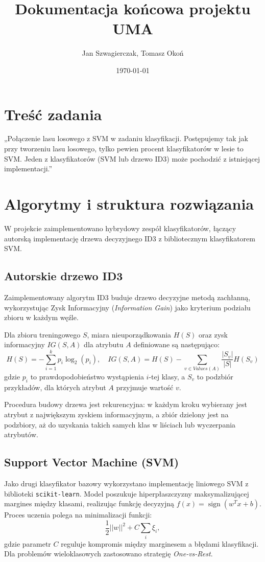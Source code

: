 \documentclass[a4paper,11pt]{article}
\title{\textbf{Dokumentacja końcowa projektu UMA}}
\author{Jan Szwagierczak, Tomasz Okoń}
\date{\today}
\begin{document}
\maketitle

\section{Treść zadania}
„Połączenie lasu losowego z SVM w zadaniu klasyfikacji. Postępujemy tak jak przy tworzeniu lasu losowego, tylko pewien procent klasyfikatorów w lesie to SVM. Jeden z klasyfikatorów (SVM lub drzewo ID3) może pochodzić z istniejącej implementacji.”


\section{Algorytmy i struktura rozwiązania}

W projekcie zaimplementowano hybrydowy zespół klasyfikatorów, łączący autorską implementację drzewa decyzyjnego ID3 z bibliotecznym klasyfikatorem SVM.

\subsection{Autorskie drzewo ID3}
Zaimplementowany algorytm ID3 buduje drzewo decyzyjne metodą zachłanną, wykorzystując Zysk Informacyjny (\textit{Information Gain}) jako kryterium podziału zbioru w każdym węźle.

Dla zbioru treningowego $S$, miara nieuporządkowania $H(S)$ oraz zysk informacyjny $IG(S,A)$ dla atrybutu $A$ definiowane są następująco:
\[
H(S) = - \sum_{i=1}^{k} p_i \log_2(p_i), \quad IG(S, A) = H(S) - \sum_{v \in Values(A)} \frac{|S_v|}{|S|} H(S_v)
\]
gdzie $p_i$ to prawdopodobieństwo wystąpienia $i$-tej klasy, a $S_v$ to podzbiór przykładów, dla których atrybut $A$ przyjmuje wartość $v$.

Procedura budowy drzewa jest rekurencyjna: w każdym kroku wybierany jest atrybut z największym zyskiem informacyjnym, a zbiór dzielony jest na podzbiory, aż do uzyskania takich samych klas w liściach lub wyczerpania atrybutów.

\subsection{Support Vector Machine (SVM)}
Jako drugi klasyfikator bazowy wykorzystano implementację liniowego SVM z biblioteki \texttt{scikit-learn}. Model poszukuje hiperpłaszczyzny maksymalizującej margines między klasami, realizując funkcję decyzyjną $f(x) = \operatorname{sign}(w^T x + b)$.
Proces uczenia polega na minimalizacji funkcji:
\[
\frac{1}{2}||w||^{2}+C\sum_{i}\xi_{i},
\]
gdzie parametr $C$ reguluje kompromis między marginesem a błędami klasyfikacji. Dla problemów wieloklasowych zastosowano strategię \textit{One-vs-Rest}.
\end{document}
